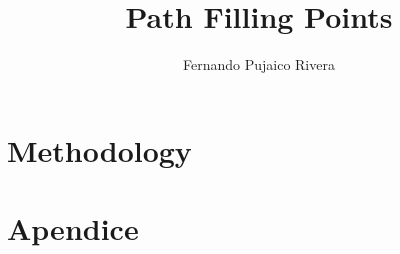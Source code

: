 \documentclass{book}
\title{Path Filling Points}
\author{Fernando Pujaico Rivera}
\begin{document}
\maketitle 

\tableofcontents



\chapter{Methodology}





\chapter{Apendice}



\printbibliography
\end{document}
